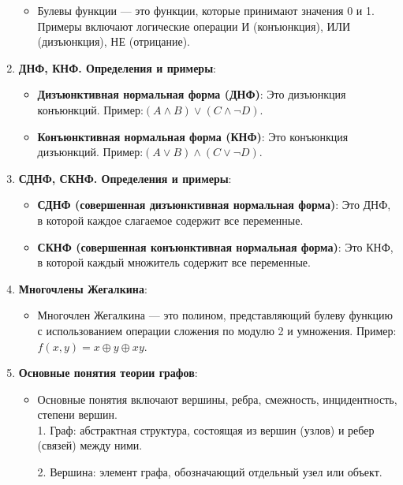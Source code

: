 \documentclass[
]{article}
\providecommand{\tightlist}{%
  \setlength{\itemsep}{0pt}\setlength{\parskip}{0pt}}
\begin{document}
\begin{enumerate}
  \begin{itemize}
  \tightlist
  \item
    Булевы функции --- это функции, которые принимают значения 0 и 1.
    Примеры включают логические операции И (конъюнкция), ИЛИ
    (дизъюнкция), НЕ (отрицание).
  \end{itemize}
\item
  \textbf{ДНФ, КНФ. Определения и примеры}:

  \begin{itemize}
  \tightlist
  \item
    \textbf{Дизъюнктивная нормальная форма (ДНФ)}: Это дизъюнкция
    конъюнкций. Пример:\((A \wedge B) \vee (C \wedge \neg D)\).
  \item
    \textbf{Конъюнктивная нормальная форма (КНФ)}: Это конъюнкция
    дизъюнкций. Пример:\((A \vee B) \wedge (C \vee \neg D)\).
  \end{itemize}
\item
  \textbf{СДНФ, СКНФ. Определения и примеры}:

  \begin{itemize}
  \tightlist
  \item
    \textbf{СДНФ (совершенная дизъюнктивная нормальная форма)}: Это ДНФ,
    в которой каждое слагаемое содержит все переменные.
  \item
    \textbf{СКНФ (совершенная конъюнктивная нормальная форма)}: Это КНФ,
    в которой каждый множитель содержит все переменные.
  \end{itemize}
\item
  \textbf{Многочлены Жегалкина}:

  \begin{itemize}
  \tightlist
  \item
    Многочлен Жегалкина --- это полином, представляющий булеву функцию с
    использованием операции сложения по модулю 2 и умножения.
    Пример:\(f(x, y) = x \oplus y \oplus xy\).
  \end{itemize}
\item
  \textbf{Основные понятия теории графов}:

  \begin{itemize}
  \tightlist
  \item
    Основные понятия включают вершины, ребра, смежность, инцидентность,
    степени вершин.\\
1. Граф: абстрактная структура, состоящая из вершин (узлов) и ребер (связей) между ними.

2. Вершина: элемент графа, обозначающий отдельный узел или объект.


\end{itemize}
\end{enumerate}
\end{document}
